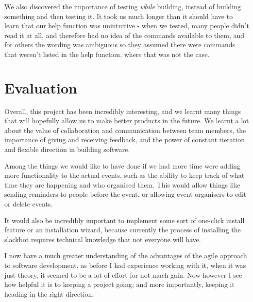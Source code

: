 \documentclass{report}
\begin{document}
We also discovered the importance of testing \emph{while} building, instead of building something and then testing it. It took us much longer than it should have to learn that our help function was unintuitive - when we tested, many people didn't read it at all, and therefore had no idea of the commands available to them, and for others the wording was ambiguous so they assumed there were commands that weren't listed in the help function, where that was not the case.

\section{Evaluation}
Overall, this project has been incredibly interesting, and we learnt many things that will hopefully allow us to make better products in the future. We learnt a lot about the value of collaboration and communication between team members, the importance of giving and receiving feedback, and the power of constant iteration and flexible direction in building software.

Among the things we would like to have done if we had more time were adding more functionality to the actual events, such as the ability to keep track of what time they are happening and who organised them. This would allow things like sending reminders to people before the event, or allowing event organisers to edit or delete events.

It would also be incredibly important to implement some sort of one-click install feature or an installation wizard, because currently the process of installing the slackbot requires technical knowledge that not everyone will have.

I now have a much greater understanding of the advantages of the agile approach to software development, as before I had experience working with it, when it was just theory, it seemed to be a lot of effort for not much gain. Now however I see how helpful it is to keeping a project going; and more importantly, keeping it heading in the right direction.
\end{document}
